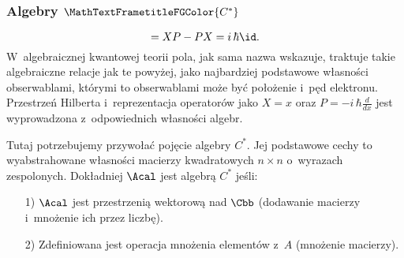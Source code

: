 \documentclass[10pt,t]{beamer}
\begin{document}
\begin{frame}
  \frametitle{Algebry $\MathTextFrametitleFGColor{C^{ * }}$}

  \vspace{-1em}



  \begin{equation}
    [ X, P ] = XP - PX = i \, \hbar \id.
  \end{equation}
  W~algebraicznej kwantowej teorii pola, jak sama nazwa wskazuje,
  traktuje takie \alert{algebraiczne} relacje jak te powyżej, jako
  najbardziej podstawowe własności obserwablami, którymi to obserwablami
  może być położenie i~pęd elektronu. Przestrzeń Hilberta i~reprezentacja
  operatorów jako $X = x$ oraz $P = -i \, \hbar \frac{ d }{ dx }$ jest
  wyprowadzona z~odpowiednich własności algebr.

  Tutaj potrzebujemy przywołać pojęcie algebry $C^{ * }$. Jej podstawowe
  cechy to wyabstrahowane własności macierzy kwadratowych $n \times n$
  o~wyrazach zespolonych. Dokładniej $\Acal$ jest algebrą $C^{ * }$ jeśli:
  \begin{itemize}

  \item[1)] $\Acal$ jest przestrzenią wektorową nad $\Cbb$ (dodawanie
    macierzy i~mnożenie ich przez liczbę).

  \item[2)] Zdefiniowana jest operacja mnożenia elementów z~$A$ (mnożenie
    macierzy).

  \end{itemize}

\end{frame}
\end{document}
